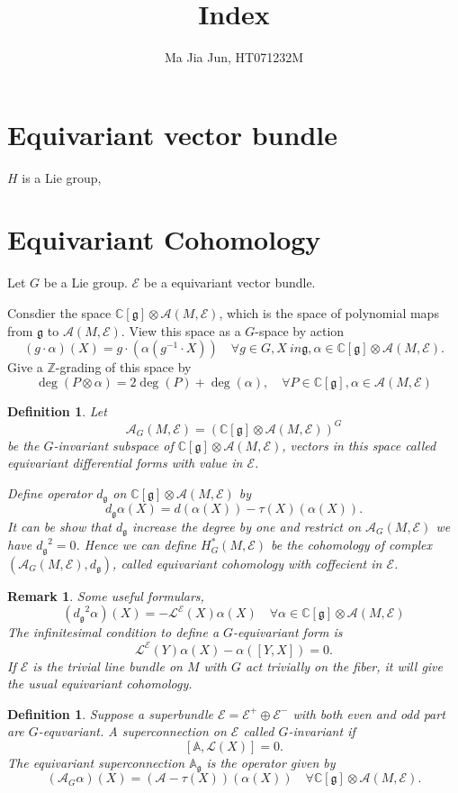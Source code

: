 \documentclass[11pt]{amsart}
\title{Index}
\author{Ma Jia Jun, HT071232M}
\newtheorem{Def}[Thm]{Definition}
\newtheorem{Rmk}[Thm]{Remark}
\def\cA{{\mathcal{A}}}
\def\cAg{{\mathcal{A}_G}}
\def\cL{{\mathcal{L}}}
\def\cE{{\mathcal{E}}}
\def\bC{{\mathbb{C}}}
\def\bA{{\mathbb{A}}}
\def\bAg{{\mathbb{A}_\mathfrak{g}}}
\def\fgg{{\mathfrak{g}}}
\def\bZ{{\mathbb{Z}}}
\def\dg{{d_{\fgg}}}
\begin{document}
\maketitle

\section{Equivariant vector bundle}

$H$ is a Lie group, 

\section{Equivariant Cohomology}
Let $G$ be a Lie group. 
$\cE$ be a equivariant vector bundle. 

Consdier the space $\bC[\fgg]\otimes \cA(M,\cE)$, which is the space of polynomial maps from $\fgg$ to $\cA(M,\cE)$. View this space as a $G$-space by action
\[
(g\cdot \alpha)(X) = g\cdot (\alpha (g^{-1}\cdot X)) \quad \forall g\in G,
X\ in \fgg, \alpha \in \bC[\fgg]\otimes \cA(M,\cE).
\]
Give a $\bZ$-grading of this space by 
\[
\deg(P\otimes \alpha) = 2\deg(P)+\deg(\alpha), 
\quad \forall P\in \bC[\fgg], \alpha \in \cA(M,\cE)
\]

\begin{Def}
Let 
\[
\cA_G(M,\cE) = \left(\bC[\fgg]\otimes \cA(M,\cE)\right)^G
\]
be the $G$-invariant subspace of $\bC[\fgg]\otimes \cA(M,\cE)$, vectors in this space called equivariant differential forms with value in $\cE$.

Define operator $\dg$ on $\bC[\fgg]\otimes \cA(M,\cE)$ by
\[
\dg \alpha(X) = d(\alpha(X)) - \tau(X)(\alpha(X)).
\]
It can be show that $\dg$ increase the degree by one and restrict on 
$\cAg(M,\cE)$ we have $\dg^2= 0$. Hence we can define
$H_G^*(M,\cE)$ be the cohomology of complex $\left(\cAg(M,\cE),\dg\right)$, 
called equivariant cohomology with coffecient in $\cE$. 
\end{Def}

\begin{Rmk}
Some useful formulars, 
\[
(\dg^2 \alpha)(X) = - \cL^\cE(X)\alpha(X)\quad \forall \alpha
\in \bC[\fgg]\otimes \cA(M,\cE)
\]
The infinitesimal condition to define a $G$-equivariant form is 
\[
\cL^\cE(Y)\alpha(X) - \alpha([Y,X]) = 0.
\]
If $\cE$ is the trivial line bundle on $M$ with $G$ act trivially on the fiber, it will give the usual equivariant cohomology.
\end{Rmk}


\begin{Def}
Suppose a superbundle $\cE = \cE^+\oplus \cE^-$ 
with both even and odd part are $G$-equvariant.
A superconnection on $\cE$ called $G$-invariant if 
\[
[\bA,\cL(X)]=0.
\]
The equivariant superconnection $\bAg$ is the operator given by 
\[
(\cAg \alpha)(X) = (\cA-\tau(X))(\alpha(X)) \quad \forall  \bC[\fgg]\otimes \cA(M,\cE).
\]
\end{Def}
\end{document}
